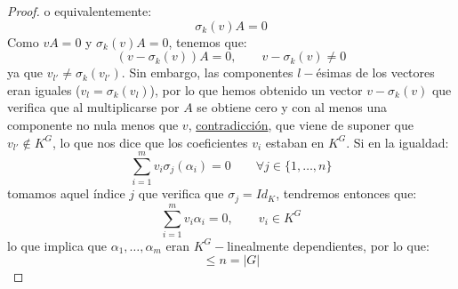 \begin{prop}[Artin]
\begin{proof}
        o equivalentemente:
        \begin{equation*}
            \sigma_k(v)A = 0
        \end{equation*}
        Como $vA = 0$ y $\sigma_k(v)A=0$, tenemos que:
        \begin{equation*}
            (v-\sigma_k(v))A = 0, \qquad v-\sigma_k(v) \neq 0
        \end{equation*}
        ya que $v_{l'} \neq \sigma_k(v_{l'})$. Sin embargo, las componentes $l-$ésimas de los vectores eran iguales ($v_l = \sigma_k(v_l)$), por lo que hemos obtenido un vector $v-\sigma_k(v)$ que verifica que al multiplicarse por $A$ se obtiene cero y con al menos una componente no nula menos que $v$, \underline{contradicción}, que viene de suponer que $v_{l'}\notin K^G$, lo que nos dice que los coeficientes $v_i$ estaban en $K^G$. Si en la igualdad: 
        \begin{equation*}
            \sum_{i=1}^m v_i \sigma_j(\alpha_i) = 0 \qquad \forall j \in \{1,\ldots,n\}
        \end{equation*}
        tomamos aquel índice $j$ que verifica que $\sigma_j = Id_K$, tendremos entonces que:
        \begin{equation*}
            \sum_{i=1}^mv_i \alpha_i = 0, \qquad v_i \in K^G
        \end{equation*}
        lo que implica que $\alpha_1, \ldots, \alpha_m$ eran $K^G-$linealmente dependientes, por lo que:
        \begin{equation*}
            [K:K^G] \leq n = |G|
        \end{equation*}
    \end{proof}
\end{prop}

